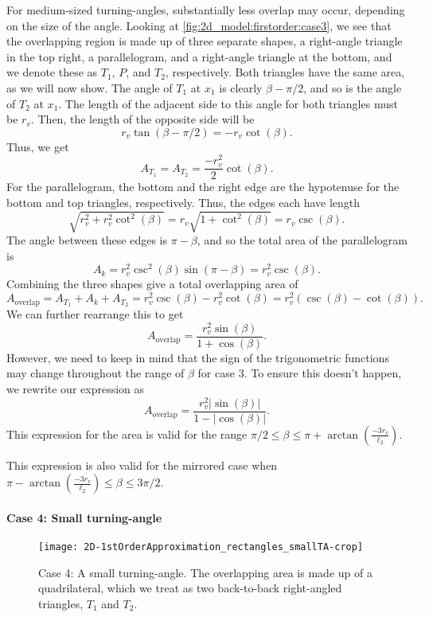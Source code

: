 For medium-sized turning-angles, substantially less overlap may occur, depending on the size of the angle. Looking at \cref{fig:2d_model:firstorder:case3}, we see that the overlapping region is made up of three separate shapes, a right-angle triangle in the top right, a parallelogram, and a right-angle triangle at the bottom, and we denote these as $T_1$, $P$, and $T_2$, respectively. Both triangles have the same area, as we will now show. The angle of $T_1$ at $x_1$ is clearly $\beta - \pi/2$, and so is the angle of $T_2$ at $x_1$. The length of the adjacent side to this angle for both triangles must be $r_v$. Then, the length of the opposite side will be 
\[r_v \tan (\beta - \pi/2) = -r_v \cot(\beta). \]
Thus, we get
\[A_{T_1} = A_{T_2} = \frac{-r_v^2}{2} \cot(\beta). \]
For the parallelogram, the bottom and the right edge are the hypotenuse for the bottom and top triangles, respectively. Thus, the edges each have length
\[\sqrt{ r_v^2 + r_v^2 \cot^2(\beta)    } = r_v \sqrt{1+ \cot^2(\beta)} = r_v \csc(\beta). \]
The angle between these edges is $\pi - \beta$, and so the total area of the parallelogram is
\[A_k = r_v^2 \csc^2(\beta) \sin(\pi - \beta)  = r_v^2 \csc(\beta).\]
Combining the three shapes give a total overlapping area of
\[A_{\text{overlap}} = A_{T_1} + A_k + A_{T_2} = r_v^2 \csc(\beta)-r_v^2 \cot(\beta) = r_v^2 \left( \csc(\beta) - \cot(\beta)\right). \]
We can further rearrange this to get
\[A_{\text{overlap}} =  \frac{r_v^2 \sin(\beta)}{1+\cos(\beta)}. \]
However, we need to keep in mind that the sign of the trigonometric functions may change throughout the range of $\beta$ for case $3$. To ensure this doesn't happen, we rewrite our expression as
\[A_{\text{overlap}} =  \frac{r_v^2 \left|\sin(\beta)\right|}{1-\left|\cos(\beta) \right|}. \]
This expression for the area is valid for the range $\pi/2 \leq \beta \leq \pi +\arctan\left(\frac{-3r_v}{\ell_2}\right)$.

This expression is also valid for the mirrored case when $\pi -\arctan\left(\frac{-3r_v}{\ell_2}\right) \leq \beta \leq 3\pi/2$.
\FloatBarrier
\paragraph{Case 4: Small turning-angle}
\begin{figure}[h!]
	\centering
	\texttt{[image: 2D-1stOrderApproximation\_rectangles\_smallTA-crop]}
	\caption[Case 4: A small turning-angle]{Case 4: A small turning-angle. The overlapping area is made up of a quadrilateral, which we treat as two back-to-back right-angled triangles, $T_1$ and $T_2$.}
	\label{fig:2d_model:firstorder:case4}
\end{figure}
\FloatBarrier

